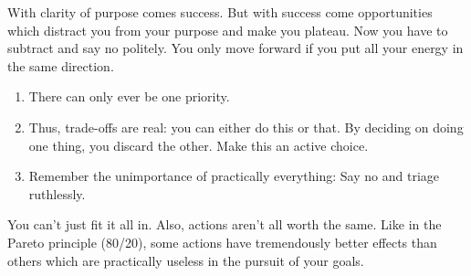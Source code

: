 \documentclass[11pt,a4paper]{article}
\begin{document}
\begin{paracol}{2}

With clarity of purpose comes success. But with success come opportunities which distract you from your purpose and make you plateau. Now you have to subtract and say no politely. You only move forward if you put all your energy in the same direction. 


\begin{enumerate}
    \item There can only ever be one priority.
    \item Thus, trade-offs are real: you can either do this or that. By deciding on doing one thing, you discard the other. Make this an active choice.
    \item Remember the unimportance of practically everything: Say no and triage ruthlessly.
\end{enumerate}

You can't just fit it all in. Also, actions aren't all worth the same. Like in the Pareto principle (80/20), some actions have tremendously better effects than others which are practically useless in the pursuit of your goals. 



\end{paracol}
\end{document}
